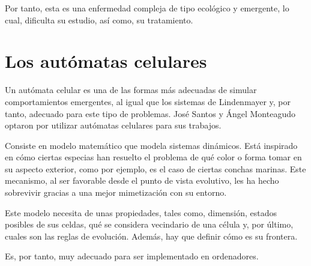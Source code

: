 Por tanto, esta es una enfermedad compleja de tipo ecológico y emergente, lo cual, dificulta su estudio,
así como, su tratamiento.

\section{Los autómatas celulares}

Un autómata celular es una de las formas más adecuadas de simular comportamientos emergentes,
al igual que los sistemas de Lindenmayer y, por tanto, adecuado para este tipo de problemas.
José Santos y Ángel Monteagudo optaron por utilizar autómatas celulares para sus trabajos.

Consiste en modelo matemático que modela sistemas dinámicos. Está inspirado en cómo ciertas especias
han resuelto el problema de qué color o forma tomar en su aspecto exterior, como por ejemplo, es
el caso de ciertas conchas marinas. Este mecanismo, al ser favorable desde el punto de vista evolutivo,
les ha hecho sobrevivir gracias a una mejor mimetización con su entorno.

Este modelo necesita de unas propiedades, tales como, dimensión, estados posibles de sus celdas,
qué se considera vecindario de una célula y, por último, cuales son las reglas de evolución. Además,
hay que definir cómo es su frontera.

Es, por tanto, muy adecuado para ser implementado en ordenadores.
